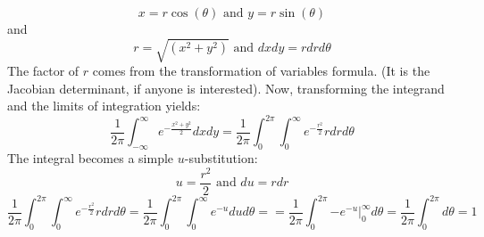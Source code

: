 \documentclass[12pt]{article} %
\begin{document}
$$x= r\cos(\theta) \textrm{ and } y= r\sin(\theta)$$
and
$$r = \sqrt{(x^2+y^2)} \textrm{ and } dxdy = r dr d\theta$$
The factor of $r$ comes from the transformation of variables formula. (It is the Jacobian determinant, if anyone is interested). Now, transforming the integrand and the limits of integration yields:
$$ \frac1{{2\pi}} \int_{-\infty}^{\infty} e^{-\frac{x^2+y^2}2} dx dy =  \frac1{{2\pi}} \int_{0}^{2\pi}  \int_{0}^{\infty} e^{-\frac{r^2}2} r dr d\theta$$
The integral becomes a simple $u$-substitution:
$$ u = \frac{r^2}2 \textrm{ and } du = r dr$$
$$ \frac1{{2\pi}} \int_{0}^{2\pi}  \int_{0}^{\infty} e^{-\frac{r^2}2} r dr d\theta =  \frac1{{2\pi}} \int_{0}^{2\pi}  \int_{0}^{\infty} e^{-u} du d\theta = =  \frac1{{2\pi}} \int_{0}^{2\pi}  \left.-e^{-u}\right\rvert_0^{\infty} d\theta =  \frac1{{2\pi}} \int_{0}^{2\pi} d\theta = 1$$
\end{document}
